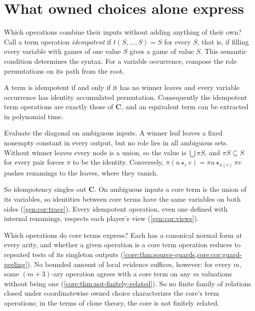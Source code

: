 \section{What owned choices alone express}\label{sec:intrinsic}

Which operations combine their inputs without adding anything of their own? Call a term operation \emph{idempotent} if $t(S,\ldots,S)=S$ for every $S$, that is, if filling every variable with games of one value $S$ gives a game of value $S$. This semantic condition determines the syntax. For a variable occurrence, compose the role permutations on its path from the root.

\begin{theorem}\label{gen:thm:core}
A term is idempotent if and only if it has no winner leaves and every variable occurrence has identity accumulated permutation. Consequently the idempotent term operations are exactly those of $\mathbf C$, and an equivalent term can be extracted in polynomial time.
\end{theorem}

\begin{idea}
Evaluate the diagonal on ambiguous inputs. A winner leaf leaves a fixed nonempty constant in every output, but no role lies in all ambiguous sets. Without winner leaves every node is a union, so the value is $\bigcup\pi S$, and $\pi S\subseteq S$ for every pair forces $\pi$ to be the identity.
Conversely, $\pi(u\star_r v)=\pi u\star_{\pi(r)}\pi v$ pushes renamings to the leaves, where they vanish.
\end{idea}

So idempotency singles out $\mathbf C$. On ambiguous inputs a core term is the union of its variables, so identities between core terms have the same variables on both sides (\cref{gen:cor:trace}). Every idempotent operation, even one defined with internal renamings, respects each player's view (\cref{gen:cor:views}).

Which operations do core terms express? Each has a canonical normal form at every arity, and whether a given operation is a core term operation reduces to repeated tests of its singleton outputs (\cref{core:thm:source-guards,core:cor:guard-peeling}). No bounded amount of local evidence suffices, however: for every $m$, some $(m+3)$-ary operation agrees with a core term on any $m$ valuations without being one (\cref{core:thm:not-finitely-related}). So no finite family of relations closed under coordinatewise owned choice characterizes the core's term operations; in the terms of clone theory, the core is not finitely related.

